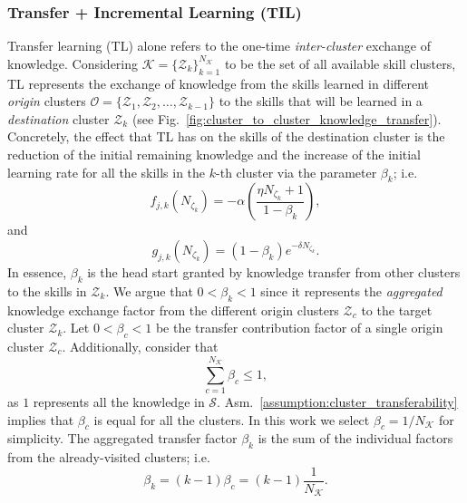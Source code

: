 \subsubsection{\textbf{Transfer + Incremental Learning (TIL)}}
Transfer learning (TL) alone refers to the one-time \emph{inter-cluster} exchange of knowledge. Considering $\mathcal{K} = \{ \mathcal{Z}_k \}^{N_\mathcal{K}}_{k=1}$ to be the set of all available skill clusters, TL represents the exchange of knowledge from the skills learned in different \emph{origin} clusters $\mathcal{O} = \{ \mathcal{Z}_1,\mathcal{Z}_2,\ldots,\mathcal{Z}_{k-1} \}$ to the skills that will be learned in a \emph{destination} cluster $\mathcal{Z}_k$ (see Fig.~\ref{fig:cluster_to_cluster_knowledge_transfer}). Concretely, the effect that TL has on the skills of the destination cluster is the reduction of the initial remaining knowledge and the increase of the initial learning rate for all the skills in the $k$-th cluster via the parameter $\beta_k$; i.e.
\begin{equation}\label{eq:f_function_transfer}
	f_{j,k}\left(N_{\zeta_k}\right) = -\alpha \left( \frac{\eta N_{\zeta_k} + 1}{1 - \beta_k} \right),
\end{equation}
and
\begin{equation}\label{eq:g_function_transfer}
	g_{j,k}\left(N_{\zeta_k}\right) = (1-\beta_k) e^{-\delta N_{\zeta_k}}.
\end{equation}
In essence, $\beta_k$ is the head start granted by knowledge transfer from other clusters to the skills in $\mathcal{Z}_k$. We argue that  $0<\beta_{k} < 1$ since it represents the \emph{aggregated} knowledge exchange factor from the different origin clusters $\mathcal{Z}_{c}$ to the target cluster $\mathcal{Z}_{k}$. Let $0<\beta_{c} < 1$ be the transfer contribution factor of a single origin cluster $\mathcal{Z}_c$. Additionally, consider that
\begin{equation}
	\sum\limits_{c=1}^{N_\mathcal{K}}\beta_{c} \leq 1,
\end{equation}
as $1$ represents all the knowledge in $\mathcal{S}$. Asm.~\ref{assumption:cluster_transferability} implies that $\beta_c$ is equal for all the clusters. In this work we select $\beta_c = 1/N_\mathcal{K}$ for simplicity. The aggregated transfer factor $\beta_k$ is the sum of the individual factors from the already-visited clusters; i.e.
\begin{equation}\label{eq:beta_k_transfer}
	\beta_{k}= \left(k-1\right)\beta_c = \left(k-1\right)\frac{1}{N_\mathcal{K}}.
\end{equation}

